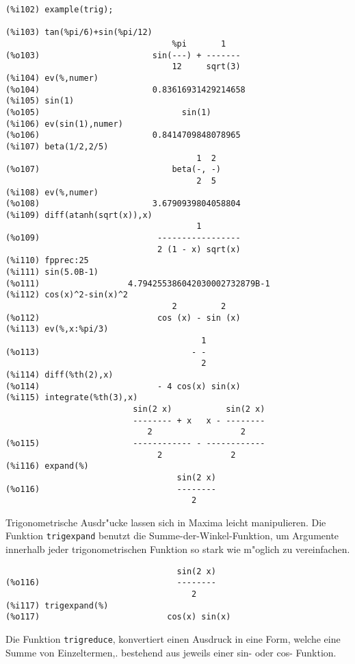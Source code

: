 \documentclass[spanish,12pt,a4paper]{article}
\begin{document}
\scriptsize
\begin{verbatim}
(%i102) example(trig);

(%i103) tan(%pi/6)+sin(%pi/12)
                                  %pi       1
(%o103)                       sin(---) + -------
                                  12     sqrt(3)
(%i104) ev(%,numer)
(%o104)                       0.83616931429214658
(%i105) sin(1)
(%o105)                             sin(1)
(%i106) ev(sin(1),numer)
(%o106)                       0.8414709848078965
(%i107) beta(1/2,2/5)
                                       1  2
(%o107)                           beta(-, -)
                                       2  5
(%i108) ev(%,numer)
(%o108)                       3.6790939804058804
(%i109) diff(atanh(sqrt(x)),x)
                                       1
(%o109)                        -----------------
                               2 (1 - x) sqrt(x)
(%i110) fpprec:25
(%i111) sin(5.0B-1)
(%o111)                  4.794255386042030002732879B-1
(%i112) cos(x)^2-sin(x)^2
                                  2         2
(%o112)                        cos (x) - sin (x)
(%i113) ev(%,x:%pi/3)
                                        1
(%o113)                               - -
                                        2
(%i114) diff(%th(2),x)
(%o114)                        - 4 cos(x) sin(x)
(%i115) integrate(%th(3),x)
                          sin(2 x)           sin(2 x)
                          -------- + x   x - --------
                             2                  2
(%o115)                   ------------ - ------------
                               2              2
(%i116) expand(%)
                                   sin(2 x)
(%o116)                            --------
                                      2
\end{verbatim}
\normalsize

Trigonometrische Ausdr"ucke lassen sich in Maxima leicht manipulieren. Die Funktion \verb|trigexpand| benutzt die Summe-der-Winkel-Funktion, um Argumente innerhalb jeder trigonometrischen Funktion so stark wie m"oglich zu vereinfachen.

\scriptsize
\begin{verbatim}
                                   sin(2 x)
(%o116)                            --------
                                      2
(%i117) trigexpand(%)
(%o117)                          cos(x) sin(x)
\end{verbatim}
\normalsize

Die Funktion \verb|trigreduce|, konvertiert einen Ausdruck in eine Form, welche eine Summe von Einzeltermen,. bestehend aus jeweils einer sin- oder cos- Funktion.
\end{document}
